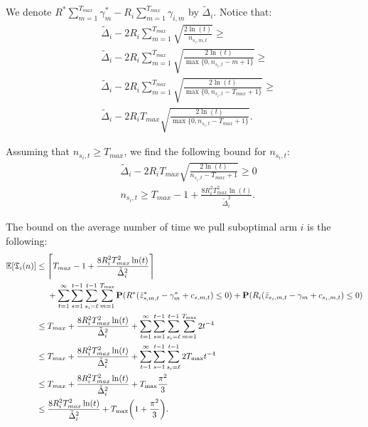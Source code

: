 We denote $R^*\sum_{m=1}^{T_{max}}\gamma^*_{m} - R_i \sum_{m=1}^{T_{max}} \gamma_{i,m}$ by $\tilde{\Delta}_i$. Notice that:
\begin{align}
	&\tilde{\Delta}_i -2R_i\sum_{m=1}^{T_{max}}\sqrt{\frac{2\ln(t)}{n_{s_i,m,t}}} \ge \nonumber\\
	&\tilde{\Delta}_i -2R_i\sum_{m=1}^{T_{max}}\sqrt{\frac{2\ln(t)}{\max{\{0,n_{s_i,t}-m+1\}}}} \ge \\
	&\tilde{\Delta}_i -2R_i\sum_{m=1}^{T_{max}}\sqrt{\frac{2\ln(t)}{\max{\{0,n_{s_i,t}-T_{max}+1\}}}} \ge \\
	&\tilde{\Delta}_i -2R_iT_{max}\sqrt{\frac{2\ln(t)}{\max{\{0,n_{s_i,t}-T_{max}+1\}}}} .
\end{align}


Assuming that $n_{s_i,t}\ge T_{max}$, we find the following bound for $n_{s_i,t}$:
\begin{align}
	&\tilde{\Delta}_i -2R_iT_{max}\sqrt{\frac{2\ln(t)}{n_{s_i,t}-T_{max}+1}} \ge 0 \nonumber\\
	&n_{s_i,t} \ge T_{max}-1+ \frac{8 R_i^2 T_{max}^2 \ln(t)}{\tilde{\Delta}_i^2}.
\end{align}

The bound on the average number of time we pull suboptimal arm $i$ is the following:
\begin{align}
	\mathbb{E}[\mathfrak{T}_i(n)] &\le \ceil[\Bigg]{T_{max}-1+ \frac{8 R_i^2 T_{max}^2 \ln(t)}{\tilde{\Delta}_i^2}} \nonumber\\ &~~~~+ \sum_{t=1}^\infty \sum_{s=1}^{t-1} \sum_{s_i=\ell}^{t-1} \sum_{m=1}^{\Tmax} \mathbf{P}(R^*(\bar{z}^*_{s,m,t} - \gamma^*_m + c_{s,m,t}) \le 0) + \mathbf{P}(R_i(\bar{z}_{s_i,m,t} - \gamma_m + c_{s_i,m,t}) \le 0)  \nonumber \\
	&\le T_{max} + \frac{8 R_i^2 T_{max}^2 \ln(t)}{\tilde{\Delta}_i^2} + \sum_{t=1}^\infty \sum_{s=1}^{t-1} \sum_{s_i=\ell}^{t-1} \sum_{m=1}^{\Tmax} 2t^{-4} \nonumber \\
	&\le T_{max} + \frac{8 R_i^2 T_{max}^2 \ln(t)}{\tilde{\Delta}_i^2} + \sum_{t=1}^\infty \sum_{s=1}^{t-1} \sum_{s_i=\ell}^{t-1} 2\Tmax t^{-4} \nonumber \\
	&\le T_{max} + \frac{8 R_i^2 T_{max}^2 \ln(t)}{\tilde{\Delta}_i^2} + \Tmax \frac{\pi^2}{3} \nonumber \\
	&\le \frac{8 R_i^2 T_{max}^2 \ln(t)}{\tilde{\Delta}_i^2} + \Tmax \bigg(1+ \frac{\pi^2}{3} \bigg) \nonumber .
\end{align}

